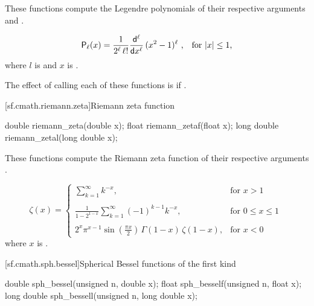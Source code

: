 \begin{itemdescr}
\pnum
\effects
These functions compute the Legendre polynomials of their
respective arguments
 and .

\pnum
\returns
\[ \mathsf{P}_\ell(x) =
     \frac{1}{2^\ell \, \ell!}
     \frac{\mathsf{d}^\ell}{\mathsf{d}x^\ell} \, (x^2 - 1) ^ \ell
     \text{ ,\quad for $|x| \le 1$,} \]
where
$l$ is  and
$x$ is .

\pnum
\remarks
The effect of calling each of these functions
is 
if .
\end{itemdescr}

[sf.cmath.riemann.zeta]{Riemann zeta function}%
%
%
%
%
\begin{itemdecl}
double       riemann_zeta(double x);
float        riemann_zetaf(float x);
long double  riemann_zetal(long double x);
\end{itemdecl}

\begin{itemdescr}

\pnum
\effects
These functions compute the Riemann zeta function
of their respective arguments
.

\pnum
\returns
\[%
  \mathsf{\zeta}(x) =
  \left\{
  \begin{array}{cl}
  \displaystyle
  \sum_{k=1}^\infty k^{-x},
  & \mbox{for $x > 1$}
  \\
  \\
  \displaystyle
  \frac{1}
	{1 - 2^{1-x}}
  \sum_{k=1}^\infty (-1)^{k-1} k^{-x},
  & \mbox{for $0 \le x \le 1$}
  \\
  \\
  \displaystyle
  2^x \pi^{x-1} \sin(\frac{\pi x}{2}) \, \Gamma(1-x) \, \zeta(1-x),
  & \mbox{for $x < 0$}
  \end{array}
  \right.
\;
\]
where
$x$ is .
\end{itemdescr}

[sf.cmath.sph.bessel]{Spherical Bessel functions of the first kind}%
%
%
%
%
%
\begin{itemdecl}
double       sph_bessel(unsigned n, double x);
float        sph_besself(unsigned n, float x);
long double  sph_bessell(unsigned n, long double x);
\end{itemdecl}

